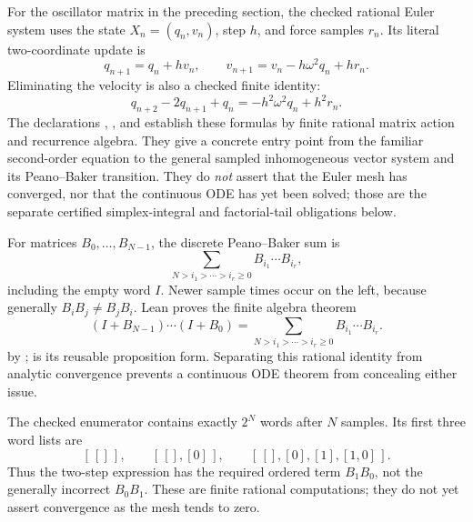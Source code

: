 \begin{theorem}
\label{thm:forced-oscillator-finite-seed}
\leanok
For the oscillator matrix in the preceding section, the checked rational
Euler system uses the state \(X_n=(q_n,v_n)\), step \(h\), and force samples
\(r_n\).  Its literal two-coordinate update is
\[
 q_{n+1}=q_n+h v_n,
 \qquad
 v_{n+1}=v_n-h\omega^2q_n+h r_n.
\]
Eliminating the velocity is also a checked finite identity:
\[
 q_{n+2}-2q_{n+1}+q_n=-h^2\omega^2q_n+h^2r_n.
\]
The declarations
,
, and
 establish
these formulas by finite rational matrix action and recurrence algebra.  They
give a concrete entry point from the familiar second-order equation to the
general sampled inhomogeneous vector system and its Peano--Baker transition.
They do \emph{not} assert that the Euler mesh has converged, nor that the
continuous ODE has yet been solved; those are the separate certified
simplex-integral and factorial-tail obligations below.
\end{theorem}

\begin{definition}
\label{def:finite-peano-baker-word-sum}
\leanok
For matrices \(B_0,\ldots,B_{N-1}\), the discrete Peano--Baker sum is
\[
 \sum_{N>i_1>\cdots>i_r\ge0}B_{i_1}\cdots B_{i_r},
\]
including the empty word \(I\). Newer sample times occur on the left, because
generally \(B_iB_j\ne B_jB_i\). Lean proves the finite algebra theorem
\[
 (I+B_{N-1})\cdots(I+B_0)
 =\sum_{N>i_1>\cdots>i_r\ge0}B_{i_1}\cdots B_{i_r}.
\]
by ; 
is its reusable proposition form. Separating this rational identity from
analytic convergence prevents a continuous ODE theorem from concealing either
issue.
\end{definition}

\begin{theorem}
\label{thm:finite-peano-baker-enumeration}
\leanok
The checked enumerator contains exactly \(2^N\) words after \(N\) samples.
Its first three word lists are
\[
 [\,[]\,],\qquad [\,[],[0]\,],\qquad
 [\,[],[0],[1],[1,0]\,].
\]
Thus the two-step expression has the required ordered term \(B_1B_0\), not
the generally incorrect \(B_0B_1\). These are finite rational computations;
they do not yet assert convergence as the mesh tends to zero.
\end{theorem}

